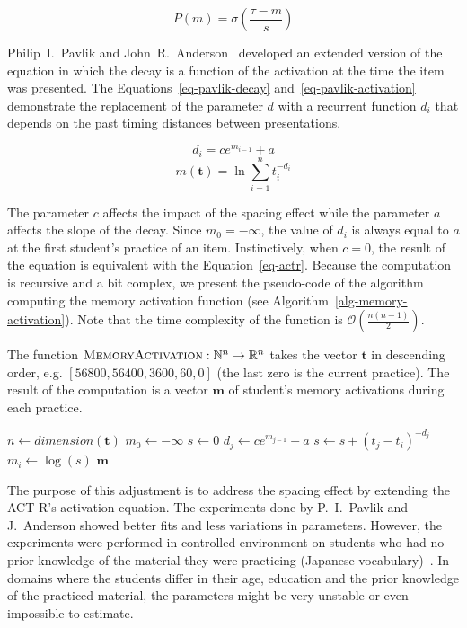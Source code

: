 \begin{equation} \label{eq-actr-p}
  P(m) = \sigma\left(\frac{\tau - m}{s}\right)
\end{equation}

Philip~I.~Pavlik and John~R.~Anderson~\cite{Pavlik2005} developed an extended version of the equation in which the decay is a function of the activation at the time the item was presented. The Equations~\ref{eq-pavlik-decay} and~\ref{eq-pavlik-activation} demonstrate the replacement of the parameter $d$ with a recurrent function $d_i$ that depends on the past timing distances between presentations.

\begin{equation} \label{eq-pavlik-decay}
  d_i = ce^{m_{i-1}} + a
\end{equation}
\begin{equation} \label{eq-pavlik-activation}
  m(\mathbf{t}) = \ln{\sum_{i=1}^{n} t_{i}^{-d_i}}
\end{equation}

The parameter $c$ affects the impact of the spacing effect while the parameter $a$ affects the slope of the decay. Since $m_0 = -\infty$, the value of $d_i$ is always equal to $a$ at the first student's practice of an item. Instinctively, when $c = 0$, the result of the equation is equivalent with the Equation~\ref{eq-actr}. Because the computation is recursive and a bit complex, we present the pseudo-code of the algorithm computing the memory activation function (see Algorithm~\ref{alg-memory-activation}). Note that the time complexity of the function is $\mathcal{O}\left(\frac{n(n-1)}{2}\right)$.

\begin{algorithm}
  \caption{The function $\textsc{MemoryActivation}: \mathbb{N}^n \rightarrow \mathbb{R}^n$ takes the vector $\mathbf{t}$ in descending order, e.g. $[56800, 56400, 3600, 60, 0]$ (the last zero is the current practice). The result of the computation is a vector $\mathbf{m}$ of student's memory activations during each practice.}
  \label{alg-memory-activation}
  \begin{algorithmic}[1]
      \State $n \gets \mathit{dimension}(\mathbf{t})$
      \State $m_0 \gets -\infty$
        \State $s \gets 0$
          \State $d_j \gets ce^{m_{j-1}} + a$
          \State $s \gets s + (t_j - t_i)^{-d_j}$
        \EndFor
        \State $m_i \gets \log(s)$
      \EndFor
      \State \Return $\mathbf{m}$
    \EndFunction
  \end{algorithmic}
\end{algorithm}

The purpose of this adjustment is to address the spacing effect by extending the ACT-R's activation equation. The experiments done by P.~I.~Pavlik and J.~Anderson showed better fits and less variations in parameters. However, the experiments were performed in controlled environment on students who had no prior knowledge of the material they were practicing (Japanese vocabulary)~\cite{Pavlik2005}. In domains where the students differ in their age, education and the prior knowledge of the practiced material, the parameters might be very unstable or even impossible to estimate.
